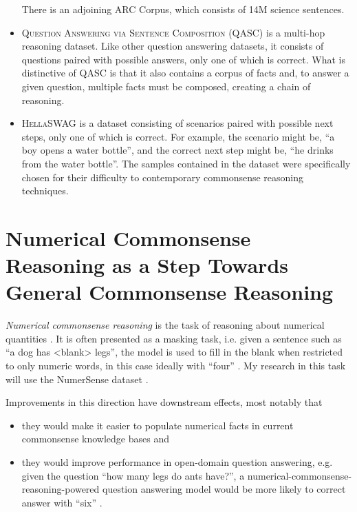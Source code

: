 \documentclass[12pt]{report}
\begin{document}
\begin{itemize}
        There is an adjoining ARC Corpus, which consists of 14M science sentences.
    \item
        \textsc{Question Answering via Sentence Composition (QASC)} \cite{Khot2020-dh} is a multi-hop reasoning dataset.
        Like other question answering datasets, it consists of questions paired with possible answers, only one of which is correct.
        What is distinctive of QASC is that it also contains a corpus of facts and, to answer a given question, multiple facts must be composed, creating a chain of reasoning.
    \item
        \textsc{HellaSWAG} \cite{Zellers2019-gw} is a dataset consisting of scenarios paired with possible next steps, only one of which is correct.
        For example, the scenario might be, \enquote{a boy opens a water bottle}, and the correct next step might be, \enquote{he drinks from the water bottle}.
        The samples contained in the dataset were specifically chosen for their difficulty to contemporary commonsense reasoning techniques.
\end{itemize}

\section{Numerical Commonsense Reasoning as a Step Towards General Commonsense Reasoning}

\textit{Numerical commonsense reasoning} is the task of reasoning about numerical quantities \cite{Lin2020-ik}.
It is often presented as a masking task, i.e. given a sentence such as \enquote{a dog has <blank> legs}, the model is used to fill in the blank when restricted to only numeric words, in this case ideally with \enquote{four} \cite{Lin2020-ik,Bian2023-rj}.
My research in this task will use the NumerSense dataset \cite{Lin2020-ik}.

Improvements in this direction have downstream effects, most notably that
\begin{itemize}[nolistsep]
    \item they would make it easier to populate numerical facts in current commonsense knowledge bases \cite{Lin2020-ik} and
    \item they would improve performance in open-domain question answering, e.g. given the question \enquote{how many legs do ants have?}, a numerical-commonsense-reasoning-powered question answering model would be more likely to correct answer with \enquote{six} \cite{Lin2020-ik}.
\end{itemize}
\end{document}
